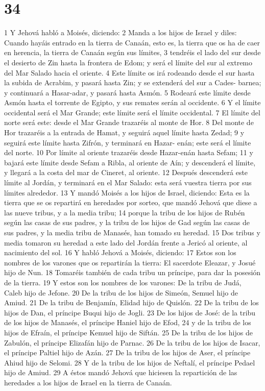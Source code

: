 \chapter{34}

1 Y Jehová habló a Moisés, diciendo:
2 Manda a los hijos de Israel y diles: Cuando hayáis entrado en la tierra de Canaán, esto es, la tierra que os ha de caer en herencia, la tierra de Canaán según sus límites,
3 tendréis el lado del sur desde el desierto de Zin hasta la frontera de Edom; y será el límite del sur al extremo del Mar Salado hacia el oriente.
4 Este límite os irá rodeando desde el sur hasta la subida de Acrabim, y pasará hasta Zin; y se extenderá del sur a Cades- barnea; y continuará a Hasar-adar, y pasará hasta Asmón.
5 Rodeará este límite desde Asmón hasta el torrente de Egipto, y sus remates serán al occidente.
6 Y el límite occidental será el Mar Grande; este límite será el límite occidental. 
7 El límite del norte será este: desde el Mar Grande trazaréis al monte de Hor.
8 Del monte de Hor trazaréis a la entrada de Hamat, y seguirá aquel límite hasta Zedad;
9 y seguirá este límite hasta Zifrón, y terminará en Hazar- enán; este será el límite del norte. 
10 Por límite al oriente trazaréis desde Hazar-enán hasta Sefam;
11 y bajará este límite desde Sefam a Ribla, al oriente de Aín; y descenderá el límite, y llegará a la costa del mar de Cineret, al oriente.
12 Después descenderá este límite al Jordán, y terminará en el Mar Salado: esta será vuestra tierra por sus límites alrededor.
13 Y mandó Moisés a los hijos de Israel, diciendo: Esta es la tierra que se os repartirá en heredades por sorteo, que mandó Jehová que diese a las nueve tribus, y a la media tribu;
14 porque la tribu de los hijos de Rubén según las casas de sus padres, y la tribu de los hijos de Gad según las casas de sus padres, y la media tribu de Manasés, han tomado su heredad.
15 Dos tribus y media tomaron su heredad a este lado del Jordán frente a Jericó al oriente, al nacimiento del sol.
16 Y habló Jehová a Moisés, diciendo:
17 Estos son los nombres de los varones que os repartirán la tierra: El sacerdote Eleazar, y Josué hijo de Nun.
18 Tomaréis también de cada tribu un príncipe, para dar la posesión de la tierra.
19 Y estos son los nombres de los varones: De la tribu de Judá, Caleb hijo de Jefone.
20 De la tribu de los hijos de Simeón, Semuel hijo de Amiud.
21 De la tribu de Benjamín, Elidad hijo de Quislón.
22 De la tribu de los hijos de Dan, el príncipe Buqui hijo de Jogli.
23 De los hijos de José: de la tribu de los hijos de Manasés, el príncipe Haniel hijo de Efod,
24 y de la tribu de los hijos de Efraín, el príncipe Kemuel hijo de Siftán.
25 De la tribu de los hijos de Zabulón, el príncipe Elizafán hijo de Parnac.
26 De la tribu de los hijos de Isacar, el príncipe Paltiel hijo de Azán.
27 De la tribu de los hijos de Aser, el príncipe Ahiud hijo de Selomi.
28 Y de la tribu de los hijos de Neftalí, el príncipe Pedael hijo de Amiud. 
29 A éstos mandó Jehová que hiciesen la repartición de las heredades a los hijos de Israel en la tierra de Canaán.


